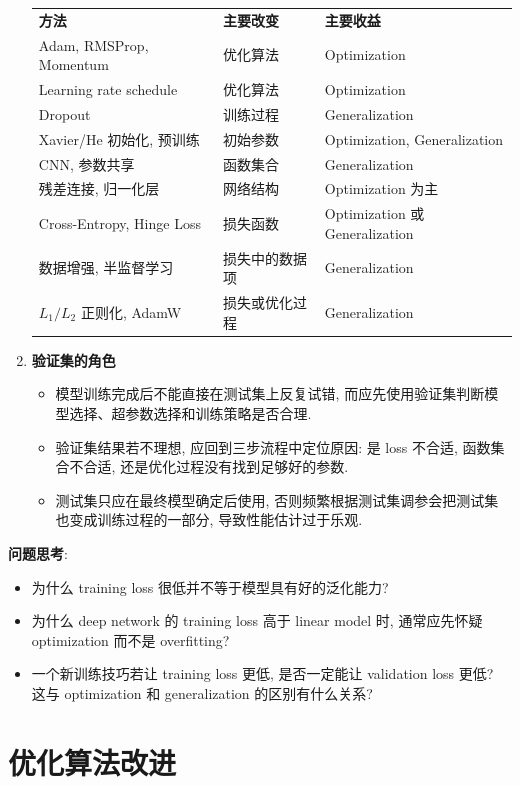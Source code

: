 \documentclass{../nndlcourse}
\begin{document}
\begin{enumerate}
\begin{center}
\begin{tabular}{lll}
      \textbf{方法} & \textbf{主要改变} & \textbf{主要收益} \\
      Adam, RMSProp, Momentum & 优化算法 & Optimization \\
      Learning rate schedule & 优化算法 & Optimization \\
      Dropout & 训练过程 & Generalization \\
      Xavier/He 初始化, 预训练 & 初始参数 & Optimization, Generalization \\
      CNN, 参数共享 & 函数集合 & Generalization \\
      残差连接, 归一化层 & 网络结构 & Optimization 为主 \\
      Cross-Entropy, Hinge Loss & 损失函数 & Optimization 或 Generalization \\
      数据增强, 半监督学习 & 损失中的数据项 & Generalization \\
      $L_1/L_2$ 正则化, AdamW & 损失或优化过程 & Generalization \\
    \end{tabular}
    \end{center}
  \item \textbf{验证集的角色}
    \begin{itemize}
      \item 模型训练完成后不能直接在测试集上反复试错, 而应先使用验证集判断模型选择、超参数选择和训练策略是否合理.
      \item 验证集结果若不理想, 应回到三步流程中定位原因: 是 loss 不合适, 函数集合不合适, 还是优化过程没有找到足够好的参数.
      \item 测试集只应在最终模型确定后使用, 否则频繁根据测试集调参会把测试集也变成训练过程的一部分, 导致性能估计过于乐观.
    \end{itemize}
\end{enumerate}

\textbf{问题思考}:
\begin{itemize}
  \item 为什么 training loss 很低并不等于模型具有好的泛化能力?
  \item 为什么 deep network 的 training loss 高于 linear model 时, 通常应先怀疑 optimization 而不是 overfitting?
  \item 一个新训练技巧若让 training loss 更低, 是否一定能让 validation loss 更低? 这与 optimization 和 generalization 的区别有什么关系?
\end{itemize}

\section{优化算法改进}
\end{document}
